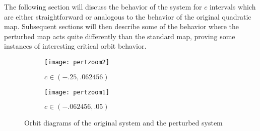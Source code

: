		The following section will discuss the behavior of the system for $c$ intervals which are either straightforward or analogous to the behavior of the original quadratic map. Subsequent sections will then describe some of the behavior where the perturbed  map acts quite differently than the standard map, proving some instances of interesting critical orbit behavior.

		\begin{figure}[h]
			\centering
			\begin{subfigure}[b]{0.5\textwidth}
					\texttt{[image: pertzoom2]}
					\caption{$c\in (-.25, .062456)$}
					\label{pertz2}
			\end{subfigure}%
			\begin{subfigure}[b]{0.5\textwidth}
					\texttt{[image: pertzoom1]}
					\caption{$c\in (-.062456, .05)$}
					\label{pertz1}%
			\end{subfigure}
			\caption{Orbit diagrams of the original system and the perturbed system}\label{fig:orbits2}
		\end{figure}